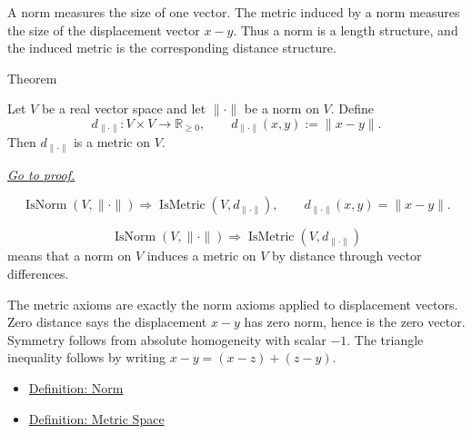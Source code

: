 \begin{remark*}[Interpretation]
A norm measures the size of one vector.  The metric induced by a norm measures
the size of the displacement vector \(x-y\).  Thus a norm is a length
structure, and the induced metric is the corresponding distance structure.
\end{remark*}

\DefinitionalRoot

\begin{theorembox}{Theorem}
\begin{theorem}\label{thm:norm-induces-metric}
Let \(V\) be a real vector space and let \(\|\cdot\|\) be a norm on \(V\).
Define
\[
  d_{\|\cdot\|}:V\times V\to\mathbb{R}_{\geq 0},
  \qquad
  d_{\|\cdot\|}(x,y):=\|x-y\|.
\]
Then \(d_{\|\cdot\|}\) is a metric on \(V\).

\smallskip
\noindent
\hyperref[prf:norm-induces-metric]{\textit{Go to proof.}}
\end{theorem}
\end{theorembox}

\begin{remark*}
\[
\operatorname{IsNorm}(V,\|\cdot\|)
\Longrightarrow
\operatorname{IsMetric}(V,d_{\|\cdot\|}),
\qquad
d_{\|\cdot\|}(x,y)=\|x-y\|.
\]
\end{remark*}

\begin{remark*}
\[
\operatorname{IsNorm}(V,\|\cdot\|)
\Longrightarrow
\operatorname{IsMetric}(V,d_{\|\cdot\|})
\]
means that a norm on \(V\) induces a metric on \(V\) by distance through
vector differences.
\end{remark*}

\begin{remark*}[Interpretation]
The metric axioms are exactly the norm axioms applied to displacement
vectors.  Zero distance says the displacement \(x-y\) has zero norm, hence is
the zero vector.  Symmetry follows from absolute homogeneity with scalar
\(-1\).  The triangle inequality follows by writing \(x-y=(x-z)+(z-y)\).
\end{remark*}

\begin{dependencies}
\begin{itemize}
  \item \hyperref[def:norm-on-real-vector-space]{Definition: Norm}
  \item \hyperref[def:metric-space]{Definition: Metric Space}
\end{itemize}
\end{dependencies}
